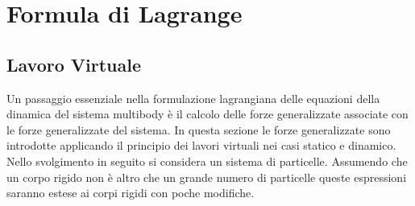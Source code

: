 
\chapter{Formula di Lagrange}
\label{Formula di Lagrange} 
\section{Lavoro Virtuale}
Un passaggio essenziale nella formulazione lagrangiana delle equazioni della dinamica del sistema multibody è il calcolo delle forze generalizzate associate con le forze generalizzate del sistema.
In questa sezione le forze generalizzate sono introdotte applicando il principio dei lavori virtuali nei casi statico e dinamico. Nello svolgimento in seguito si considera un sistema di particelle.
Assumendo che un corpo rigido non è altro che un grande numero di particelle queste espressioni saranno estese ai corpi rigidi con poche modifiche.
